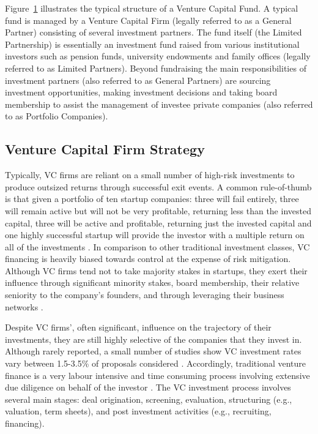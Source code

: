 \documentclass[../thesis/thesis.tex]{subfiles}
\begin{document}
\begin{refsection}
Figure~\ref{fig:litreview:criteria:fund} illustrates the typical structure of a Venture Capital Fund. A typical fund is managed by a Venture Capital Firm (legally referred to as a General Partner) consisting of several investment partners. The fund itself (the Limited Partnership) is essentially an investment fund raised from various institutional investors such as pension funds, university endowments and family offices (legally referred to as Limited Partners). Beyond fundraising the main responsibilities of investment partners (also referred to as General Partners) are sourcing investment opportunities, making investment decisions and taking board membership to assist the management of investee private companies (also referred to as Portfolio Companies).

\begin{figure}[!htb]
    \centering
    
    \caption{}
    \label{fig:litreview:criteria:fund}
\end{figure}

\subsection{Venture Capital Firm Strategy}

Typically, VC firms are reliant on a small number of high-risk investments to produce outsized returns through successful exit events. A common rule-of-thumb is that given a portfolio of ten startup companies: three will fail entirely, three will remain active but will not be very profitable, returning less than the invested capital, three will be active and profitable, returning just the invested capital and one highly successful startup will provide the investor with a multiple return on all of the investments \cite{stone2014}. In comparison to other traditional investment classes, VC financing is heavily biased towards control at the expense of risk mitigation. Although VC firms tend not to take majority stakes in startups, they exert their influence through significant minority stakes, board membership, their relative seniority to the company’s founders, and through leveraging their business networks \cite{fried2006}.

Despite VC firms’, often significant, influence on the trajectory of their investments, they are still highly selective of the companies that they invest in. Although rarely reported, a small number of studies show VC investment rates vary between 1.5-3.5\% of proposals considered \cite{stone2014}. Accordingly, traditional venture finance is a very labour intensive and time consuming process involving extensive due diligence on behalf of the investor \cite{fried1994}. The VC investment process involves several main stages: deal origination, screening, evaluation, structuring (e.g., valuation, term sheets), and post investment activities (e.g., recruiting, financing).


\end{refsection}
\end{document}
